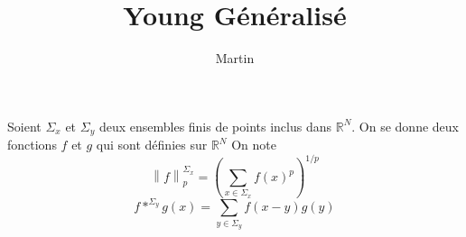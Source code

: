 \documentclass[11pt,a4paper]{article}
\author{Martin}
\title{Young Généralisé}
\begin{document}
\maketitle
\theoremstyle{plain}
\newtheorem{The}{Theorem}[section]
\newtheorem{Prop}{Proposition}[section]
\newtheorem{Lem}{Lemma}[section]
\theoremstyle{definition}
\newtheorem{Def}{Definition}[section]
\newcommand{\enstq}[2]{\left\{#1\mathrel{}\middle|\mathrel{}#2\right\}}
\newcommand{\Lp}[2]{L^#1(#2)}
\newcommand{\Sob}[3]{W^{#1,#2}(#3)}
\newcommand{\RN}[0]{\mathbb{R}^N}
\newcommand{\norm}[1]{\left\|#1\right\|}
\newcommand{\sinc}[0]{\textup{sinc}}
\newcommand{\N}[0]{\mathbb{N}}
\newcommand{\R}[0]{\mathbb{R}}
\newcommand{\Z}[0]{\mathbb{Z}}

Soient $\Sigma_x$ et $\Sigma_y$ deux ensembles finis de points inclus dans $\RN$. On se donne deux fonctions $f$ et $g$ qui sont définies sur $\RN$
On note \[\norm{f}_p^{\Sigma_x} =\left( \sum_{x \in \Sigma_x} f(x)^p\right)^{1/p}\]
\[f \ast^{\Sigma_y} g (x) = \sum_{y\in\Sigma_y} f(x-y) g(y)\]
\end{document}
